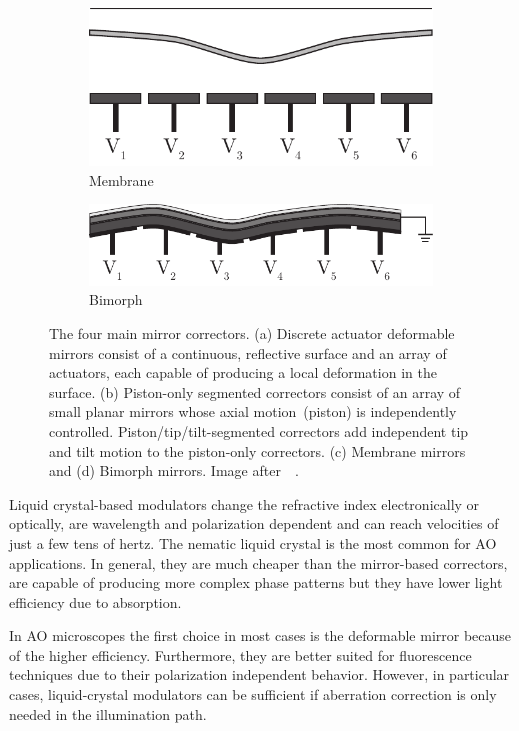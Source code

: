 \begin{figure}[tbh]
			\begin{subfigure}[b]{0.25\textwidth}
							\includegraphics[width=\textwidth]{images/deformable_membrane}
							\caption{Membrane}
							\label{fig:Correctors_membrane}
			\end{subfigure}
			\quad
			\begin{subfigure}[b]{0.25\textwidth}
							\includegraphics[width=\textwidth]{images/deformable_bimorph}
							\caption{Bimorph}
							\label{fig:Correctors_bimorph}
			\end{subfigure}							
			\caption{The four main mirror correctors. (a) Discrete actuator deformable mirrors consist of a continuous, reflective surface and an array of actuators, each capable of producing a local deformation in the surface. (b) Piston-only segmented correctors consist of an array of small planar mirrors whose axial motion~(piston) is independently controlled. Piston/tip/tilt-segmented correctors add independent tip and tilt motion to the piston-only correctors. (c) Membrane mirrors and (d) Bimorph mirrors. Image after~~\cite{AO_vision_science}.}
	\label{fig:Correctors}
\end{figure} 


Liquid crystal-based modulators change the refractive index electronically or optically, are wavelength and polarization dependent and can reach velocities of just a few tens of hertz. The nematic liquid crystal is the most common for AO applications. In general, they are much cheaper than the mirror-based correctors, are capable of producing more complex phase patterns but they have lower light efficiency due to absorption.   

In AO microscopes the first choice in most cases is the deformable mirror because of the higher efficiency. Furthermore, they are better suited for fluorescence techniques due to their polarization independent behavior. However, in particular cases, liquid-crystal modulators can be sufficient if aberration correction is only needed in the illumination path.
